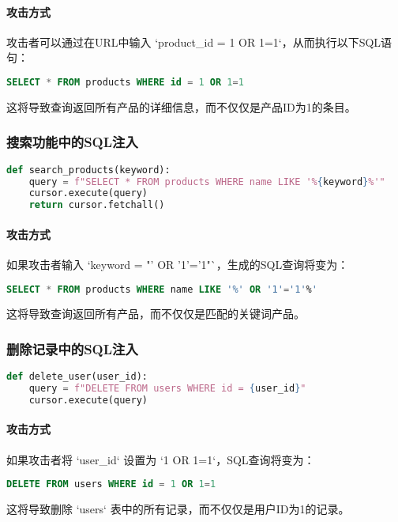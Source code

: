 \documentclass{article}
\begin{document}
\paragraph{攻击方式}
攻击者可以通过在URL中输入 `product\_id = 1 OR 1=1`，从而执行以下SQL语句：
\begin{lstlisting}[language=SQL]
SELECT * FROM products WHERE id = 1 OR 1=1
\end{lstlisting}
这将导致查询返回所有产品的详细信息，而不仅仅是产品ID为1的条目。

\subsubsection{搜索功能中的SQL注入}
\begin{lstlisting}[language=Python, caption=搜索功能中的SQL注入]
def search_products(keyword):
    query = f"SELECT * FROM products WHERE name LIKE '%{keyword}%'"
    cursor.execute(query)
    return cursor.fetchall()
\end{lstlisting}

\paragraph{攻击方式}
如果攻击者输入 `keyword = "' OR '1'='1"`，生成的SQL查询将变为：
\begin{lstlisting}[language=SQL]
SELECT * FROM products WHERE name LIKE '%' OR '1'='1'%'
\end{lstlisting}
这将导致查询返回所有产品，而不仅仅是匹配的关键词产品。

\subsubsection{删除记录中的SQL注入}
\begin{lstlisting}[language=Python, caption=删除记录中的SQL注入]
def delete_user(user_id):
    query = f"DELETE FROM users WHERE id = {user_id}"
    cursor.execute(query)
\end{lstlisting}

\paragraph{攻击方式}
如果攻击者将 `user\_id` 设置为 `1 OR 1=1`，SQL查询将变为：
\begin{lstlisting}[language=SQL]
DELETE FROM users WHERE id = 1 OR 1=1
\end{lstlisting}
这将导致删除 `users` 表中的所有记录，而不仅仅是用户ID为1的记录。
\end{document}
